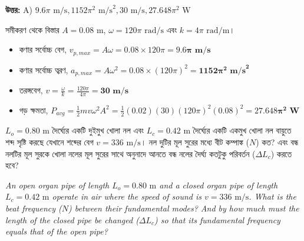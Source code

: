 \documentclass[12pt, a4paper]{article}
\begin{document}
\vspace{0.5em}
\begin{tcolorbox}[answerbox]
    \textbf{\color{success} উত্তর:} A) $9.6\pi\text{ m/s}, 1152\pi^2\text{ m/s}^2, 30\text{ m/s}, 27.648\pi^2\text{ W}$
\end{tcolorbox}
\vspace{1em}

\begin{tcolorbox}[solutionbox={সমাধান (Solution)}]
    \noindent
    সমীকরণ থেকে বিস্তার $A = 0.08\text{ m}$, $\omega = 120\pi\text{ rad/s}$ এবং $k = 4\pi\text{ rad/m}$।
    \begin{itemize}[leftmargin=1.5em, itemsep=0.2em]
        \item কণার সর্বোচ্চ বেগ, $v_{p,max} = A\omega = 0.08 \times 120\pi = \mathbf{9.6\pi\text{ m/s}}$
        \item কণার সর্বোচ্চ ত্বরণ, $a_{p,max} = A\omega^2 = 0.08 \times (120\pi)^2 = \mathbf{1152\pi^2\text{ m/s}^2}$
        \item তরঙ্গবেগ, $v = \frac{\omega}{k} = \frac{120\pi}{4\pi} = \mathbf{30\text{ m/s}}$
        \item গড় ক্ষমতা, $P_{avg} = \frac{1}{2} m v \omega^2 A^2 = \frac{1}{2} (0.02) (30) (120\pi)^2 (0.08)^2 = \mathbf{27.648\pi^2\text{ W}}$
    \end{itemize}
\end{tcolorbox}

\vspace{2em}

\begin{tcolorbox}[questionbox={প্রশ্ন (Question) 18}]
    \noindent
    $L_o = 0.80\text{ m}$ দৈর্ঘ্যের একটি দুইমুখ খোলা নল এবং $L_c = 0.42\text{ m}$ দৈর্ঘ্যের একটি একমুখ খোলা নল বায়ুতে শব্দ সৃষ্টি করছে যেখানে শব্দের বেগ $v = 336\text{ m/s}$। নল দুটির মূল সুরের মধ্যে বীট কম্পাঙ্ক ($N$) কত? এবং বন্ধ নলটির মূল সুরকে খোলা নলের মূল সুরের সাথে অনুনাদে আনতে বন্ধ নলের দৈর্ঘ্য কতটুকু পরিবর্তন ($\Delta L_c$) করতে হবে?
    
    \vspace{0.8em}
    \begin{english}
    \noindent\textit{\color{darkgray}
    An open organ pipe of length $L_o = 0.80\text{ m}$ and a closed organ pipe of length $L_c = 0.42\text{ m}$ operate in air where the speed of sound is $v = 336\text{ m/s}$. What is the beat frequency ($N$) between their fundamental modes? And by how much must the length of the closed pipe be changed ($\Delta L_c$) so that its fundamental frequency equals that of the open pipe?
    }
    \end{english}
\end{tcolorbox}
\end{document}
